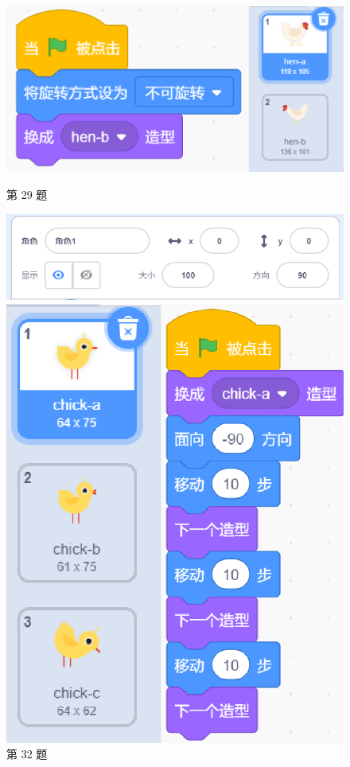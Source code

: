 \documentclass[10pt, a4paper]{article}
\begin{document}
\begin{enumerate}
\begin{figure}[htbp]
            \begin{minipage}[t]{.3\textwidth}
                \centering
                \includegraphics[width=\textwidth]{29.png}
                \caption*{第 29 题}
            \end{minipage}
            \begin{minipage}[t]{.3\textwidth}
                \centering
                \includegraphics[width=\textwidth]{32.png}
                \caption*{第 32 题}
            \end{minipage}
            \begin{minipage}[t]{.18\textwidth}
                \centering
                \includegraphics[width=\textwidth]{33.png}

\end{minipage}
\end{figure}
\end{enumerate}
\end{document}
